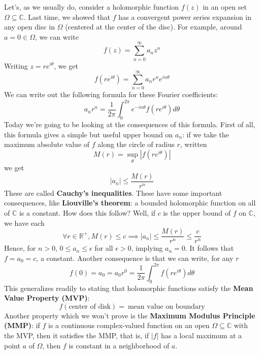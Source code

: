 \documentclass{article}
\newcommand{\mbb}[1]{\mathbb{#1}}
\newcommand{\reals}{\mbb{R}}
\begin{document}
Let's, as we usually do, consider a holomorphic function \(f(z)\) in an open set \(\Omega \subseteq \mbb{C}\). Last time, we showed that \(f\) has a convergent power series expansion in any open disc in \(\Omega\) (centered at the center of the disc). For example, around \(a = 0 \in \Omega\), we can write
\[f(z) = \sum_{n = 0}^\infty a_nz^n\]
Writing \(z = re^{i\theta}\), we get
\[f(re^{i\theta}) = \sum_{n = 0}^\infty a_nr^ne^{in\theta}\]
We can write out the following formula for these Fourier coefficients:
\[a_nr^n = \frac{1}{2\pi}\int_0^{2\pi}e^{-in\theta}f(re^{i\theta})d\theta\]
Today we're going to be looking at the consequences of this formula. First of all, this formula gives a simple but useful upper bound on \(a_n\): if we take the maximum absolute value of \(f\) along the circle of radius \(r\), written
\[M(r) = \sup_\theta|f(re^{i\theta})|\]
we get
\[|a_n| \leq \frac{M(r)}{r^n}\]
These are called \textbf{Cauchy's inequalities}. These have some important consequences, like \textbf{Liouville's theorem}: a bounded holomorphic function on all of \(\mbb{C}\) is a constant. How does this follow? Well, if \(c\) is the upper bound of \(f\) on \(\mbb{C}\), we have each
\[\forall r \in \reals^+, M(r) \leq c \implies |a_n| \leq \frac{M(r)}{r^n} \leq \frac{c}{r^n}\]
Hence, for \(n > 0\), \(0 \leq a_n \leq \epsilon\) for all \(\epsilon > 0\), implying \(a_n = 0\). It follows that \(f = a_0 = c\), a constant. Another consequence is that we can write, for any \(r\)
\[f(0) = a_0 = a_0r^0 = \frac{1}{2\pi}\int_0^{2\pi}f(re^{i\theta})d\theta\]
This generalizes readily to stating that holomorphic functions satisfy the \textbf{Mean Value Property (MVP)}:
\[f(\text{center of disk}) = \ \text{mean value on boundary}\]
Another property which we won't prove is the \textbf{Maximum Modulus Principle (MMP)}: if \(f\) is a continuous complex-valued function on an open \(\Omega \subseteq \mbb{C}\) with the MVP, then it satisfies the MMP, that is, if \(|f|\) has a local maximum at a point \(a\) of \(\Omega\), then \(f\) is constant in a neighborhood of \(a\).
\end{document}
